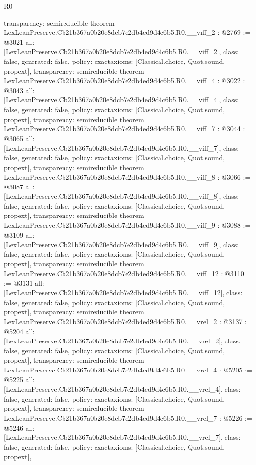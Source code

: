 \begin{lexlean}{R0}
\begin{coremodule}
{  transparency: semireducible
}
theorem LexLeanPreserve.Cb21b367a0b20e8dcb7e2db4ed9d4c6b5.R0.__viff_2 : @2769 := @3021 {
  all: [LexLeanPreserve.Cb21b367a0b20e8dcb7e2db4ed9d4c6b5.R0.__viff_2],
  class: false,
  generated: false,
  policy: exact{axioms: [Classical.choice, Quot.sound, propext]},
  transparency: semireducible
}
theorem LexLeanPreserve.Cb21b367a0b20e8dcb7e2db4ed9d4c6b5.R0.__viff_4 : @3022 := @3043 {
  all: [LexLeanPreserve.Cb21b367a0b20e8dcb7e2db4ed9d4c6b5.R0.__viff_4],
  class: false,
  generated: false,
  policy: exact{axioms: [Classical.choice, Quot.sound, propext]},
  transparency: semireducible
}
theorem LexLeanPreserve.Cb21b367a0b20e8dcb7e2db4ed9d4c6b5.R0.__viff_7 : @3044 := @3065 {
  all: [LexLeanPreserve.Cb21b367a0b20e8dcb7e2db4ed9d4c6b5.R0.__viff_7],
  class: false,
  generated: false,
  policy: exact{axioms: [Classical.choice, Quot.sound, propext]},
  transparency: semireducible
}
theorem LexLeanPreserve.Cb21b367a0b20e8dcb7e2db4ed9d4c6b5.R0.__viff_8 : @3066 := @3087 {
  all: [LexLeanPreserve.Cb21b367a0b20e8dcb7e2db4ed9d4c6b5.R0.__viff_8],
  class: false,
  generated: false,
  policy: exact{axioms: [Classical.choice, Quot.sound, propext]},
  transparency: semireducible
}
theorem LexLeanPreserve.Cb21b367a0b20e8dcb7e2db4ed9d4c6b5.R0.__viff_9 : @3088 := @3109 {
  all: [LexLeanPreserve.Cb21b367a0b20e8dcb7e2db4ed9d4c6b5.R0.__viff_9],
  class: false,
  generated: false,
  policy: exact{axioms: [Classical.choice, Quot.sound, propext]},
  transparency: semireducible
}
theorem LexLeanPreserve.Cb21b367a0b20e8dcb7e2db4ed9d4c6b5.R0.__viff_12 : @3110 := @3131 {
  all: [LexLeanPreserve.Cb21b367a0b20e8dcb7e2db4ed9d4c6b5.R0.__viff_12],
  class: false,
  generated: false,
  policy: exact{axioms: [Classical.choice, Quot.sound, propext]},
  transparency: semireducible
}
theorem LexLeanPreserve.Cb21b367a0b20e8dcb7e2db4ed9d4c6b5.R0.__vrel_2 : @3137 := @5204 {
  all: [LexLeanPreserve.Cb21b367a0b20e8dcb7e2db4ed9d4c6b5.R0.__vrel_2],
  class: false,
  generated: false,
  policy: exact{axioms: [Classical.choice, Quot.sound, propext]},
  transparency: semireducible
}
theorem LexLeanPreserve.Cb21b367a0b20e8dcb7e2db4ed9d4c6b5.R0.__vrel_4 : @5205 := @5225 {
  all: [LexLeanPreserve.Cb21b367a0b20e8dcb7e2db4ed9d4c6b5.R0.__vrel_4],
  class: false,
  generated: false,
  policy: exact{axioms: [Classical.choice, Quot.sound, propext]},
  transparency: semireducible
}
theorem LexLeanPreserve.Cb21b367a0b20e8dcb7e2db4ed9d4c6b5.R0.__vrel_7 : @5226 := @5246 {
  all: [LexLeanPreserve.Cb21b367a0b20e8dcb7e2db4ed9d4c6b5.R0.__vrel_7],
  class: false,
  generated: false,
  policy: exact{axioms: [Classical.choice, Quot.sound, propext]},
}
\end{coremodule}
\end{lexlean}
